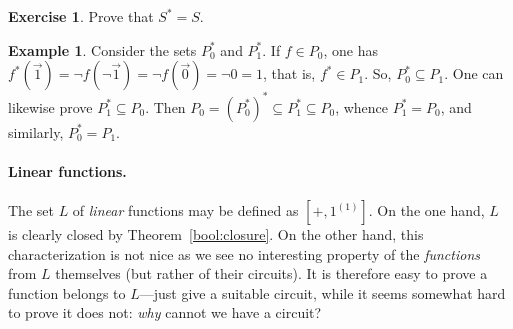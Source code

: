 \documentclass[12pt,notitlepage]{article}
\theoremstyle{plain}
\theoremstyle{definition}
\newtheorem{exc}[thm]{Exercise}
\newtheorem{exm}[thm]{Example}
\theoremstyle{plain}
\newcommand{\sbs}{\subseteq}
\newcommand{\1}{\mathbf{1}}
\newcommand{\0}{\mathbf{0}}
\begin{document}
\begin{exc}
Prove that $S^* = S$.
\end{exc}
\begin{exm}\label{bool:const_dual}
Consider the sets $P^*_0$ and $P^*_1$. If $f \in P_0$, one has $f^*(\vec 1) = \neg f (\neg \vec 1) = \neg f (\vec 0) = \neg 0 = 1$, that is, $f^* \in P_1$. So, $P^*_0 \sbs P_1$. One can likewise prove $P^*_1 \sbs P_0$. Then $P_0 = (P^*_0)^* \sbs P^*_1 \sbs P_0$, whence $P^*_1 = P_0$, and similarly, $P^*_0 = P_1$.
\end{exm}

\paragraph{Linear functions.}
The set $L$ of \emph{linear} functions may be defined as $[{+}, 1^{(1)}]$. On the one hand, $L$  is clearly closed by Theorem~\ref{bool:closure}. On the other hand, this characterization is not nice as we see no interesting property of the \emph{functions} from $L$ themselves (but rather of their circuits). It is therefore easy to prove a function belongs to $L$---just give a suitable circuit, while it seems somewhat hard to prove it does not: \emph{why} cannot we have a circuit?
\end{document}
